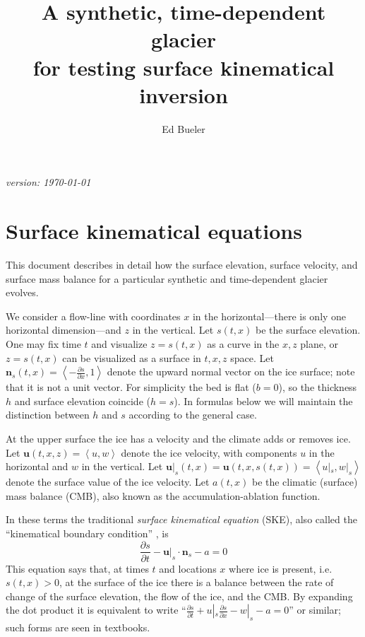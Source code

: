 \documentclass[letterpaper,final,12pt,reqno]{amsart}
\newcommand{\bn}{\mathbf{n}}
\newcommand{\bu}{\mathbf{u}}
\begin{document}

\title[Synthetic, time-dependent glacier]{A synthetic, time-dependent glacier \\ for testing surface kinematical inversion}

\author{Ed Bueler}

\maketitle

\begin{center}
{\footnotesize
\emph{version: \today}}
\end{center}

\thispagestyle{empty}

\section{Surface kinematical equations}  This document describes in detail how the surface elevation, surface velocity, and surface mass balance for a particular synthetic and time-dependent glacier evolves.

We consider a flow-line with coordinates $x$ in the horizontal---there is only one horizontal dimension---and $z$ in the vertical.  Let $s(t,x)$ be the surface elevation.  One may fix time $t$ and visualize $z=s(t,x)$ as a curve in the $x,z$ plane, or $z=s(t,x)$ can be visualized as a surface in $t,x,z$ space.  Let $\bn_s(t,x) = \left<-\frac{\partial s}{\partial x},1\right>$ denote the upward normal vector on the ice surface; note that it is not a unit vector.  For simplicity the bed is flat ($b=0$), so the thickness $h$ and surface elevation coincide ($h=s$).  In formulas below we will maintain the distinction between $h$ and $s$ according to the general case.

At the upper surface the ice has a velocity and the climate adds or removes ice.  Let $\bu(t,x,z)=\left<u,w\right>$ denote the ice velocity, with components $u$ in the horizontal and $w$ in the vertical.  Let $\bu|_s(t,x) = \bu(t,x,s(t,x)) = \left<u|_s,w|_s\right>$ denote the surface value of the ice velocity.  Let $a(t,x)$ be the climatic (surface) mass balance (CMB), also known as the accumulation-ablation function.

In these terms the traditional \emph{surface kinematical equation} (SKE), also called the ``kinematical boundary condition'' \cite{FowlerNg2021,GreveBlatter2009}, is
\begin{equation}
\frac{\partial s}{\partial t} - \bu|_s \cdot \bn_s - a = 0  \label{ske}
\end{equation}
This equation says that, at times $t$ and locations $x$ where ice is present, i.e.~$s(t,x)>0$, at the surface of the ice there is a balance between the rate of change of the surface elevation, the flow of the ice, and the CMB.  By expanding the dot product it is equivalent to write ``$\frac{\partial s}{\partial t} + u|_s \frac{\partial s}{\partial x} - w|_s - a = 0$'' or similar; such forms are seen in textbooks.
\end{document}
